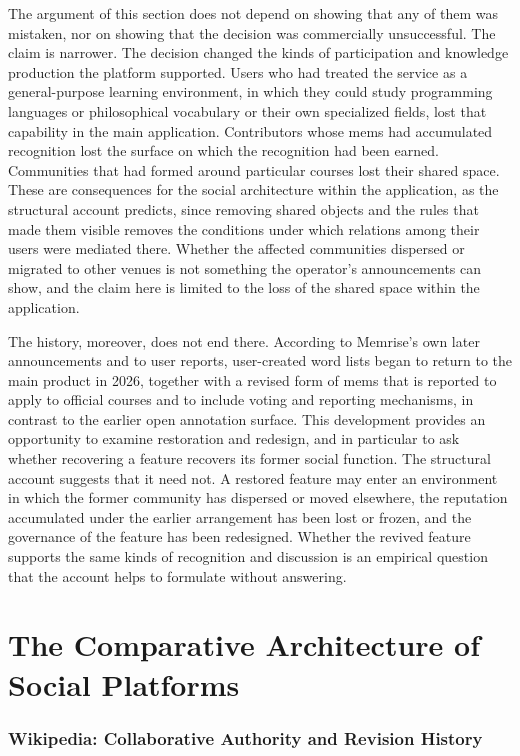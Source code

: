 \documentclass[11pt]{article}
\theoremstyle{remark}
\begin{document}
The argument of this section does not depend on showing that any of them was mistaken, nor on showing that the decision was commercially unsuccessful. The claim is narrower. The decision changed the kinds of participation and knowledge production the platform supported. Users who had treated the service as a general-purpose learning environment, in which they could study programming languages or philosophical vocabulary or their own specialized fields, lost that capability in the main application. Contributors whose mems had accumulated recognition lost the surface on which the recognition had been earned. Communities that had formed around particular courses lost their shared space. These are consequences for the social architecture within the application, as the structural account predicts, since removing shared objects and the rules that made them visible removes the conditions under which relations among their users were mediated there. Whether the affected communities dispersed or migrated to other venues is not something the operator's announcements can show, and the claim here is limited to the loss of the shared space within the application.

The history, moreover, does not end there. According to Memrise's own later announcements and to user reports, user-created word lists began to return to the main product in 2026, together with a revised form of mems that is reported to apply to official courses and to include voting and reporting mechanisms, in contrast to the earlier open annotation surface. This development provides an opportunity to examine restoration and redesign, and in particular to ask whether recovering a feature recovers its former social function. The structural account suggests that it need not. A restored feature may enter an environment in which the former community has dispersed or moved elsewhere, the reputation accumulated under the earlier arrangement has been lost or frozen, and the governance of the feature has been redesigned. Whether the revived feature supports the same kinds of recognition and discussion is an empirical question that the account helps to formulate without answering.

\part{The Comparative Architecture of Social Platforms}

\section{Wikipedia: Collaborative Authority and Revision History}
\end{document}
